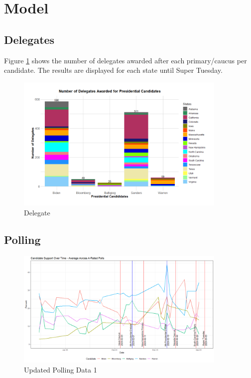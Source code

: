 \section{Model}\label{model}

\subsection{Delegates}
Figure \ref{Delegate} shows the number of delegates awarded after each primary/caucus per candidate. The results are displayed for each state until Super Tuesday.  
\begin{figure}[H]
    \centering
    \includegraphics[width=0.9\textwidth]{figures/Delegate.png}
    \caption{Delegate}
    \label{Delegate}
\end{figure}

\subsection{Polling}

\begin{figure}[H]
    \centering
    \includegraphics[width=0.9\textwidth]{figures/long-A-rated-polls.png}
    \caption{Updated Polling Data 1 }
    \label{Updated-Polling-Data-1}
\end{figure}

